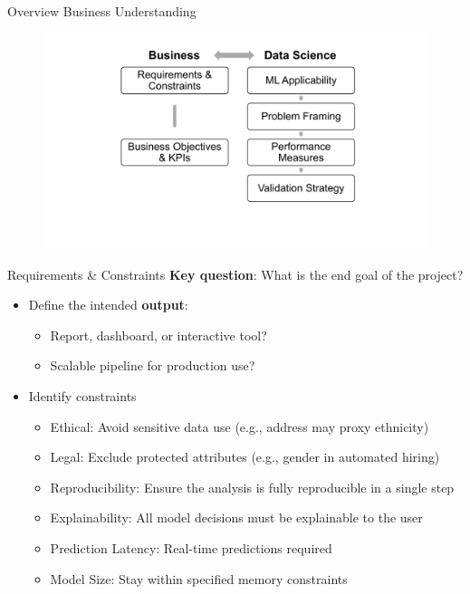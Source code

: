 \documentclass[10pt,compress,t,notes=noshow, xcolor=table]{beamer}
\begin{document}
\begin{frame}{Overview Business Understanding}
\begin{figure}[h]
\includegraphics[width=\textwidth]{figure_man/BusinessUnderstandingOverview.png}
\end{figure}
\end{frame}

\begin{frame}{Requirements \& Constraints}
\label{requirements-analysis}
\textbf{Key question}: What is the end goal of the project?
\begin{itemize}
\item
  Define the intended \textbf{output}:
  \begin{itemize}
      \item Report, dashboard, or interactive tool?
      \item Scalable pipeline for production use?
  \end{itemize}
\pause
\item Identify constraints%
    \begin{itemize}
      \item
        Ethical: Avoid sensitive data use (e.g., address may proxy ethnicity)
      \item
        Legal: Exclude protected attributes (e.g., gender in automated hiring)  %
      \item
        Reproducibility: Ensure the analysis is fully reproducible in a single step
      \item
        Explainability: All model decisions must be explainable to the user
        \item Prediction Latency: Real-time predictions required
        \item Model Size: Stay within specified memory constraints
      \end{itemize}
\end{itemize}
\end{frame}
\end{document}
